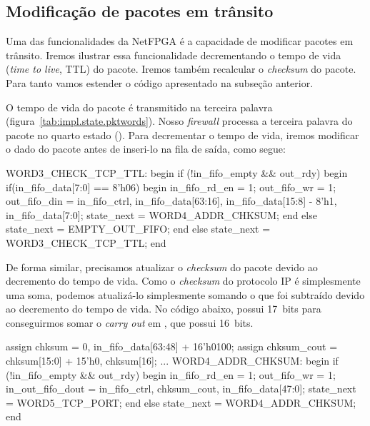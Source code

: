 \subsection{Modificação de pacotes em trânsito}
\label{sec:impl.mod}

Uma das funcionalidades da NetFPGA é a capacidade de modificar pacotes
em trânsito.  Iremos ilustrar essa funcionalidade decrementando o tempo
de vida (\emph{time to live}, TTL) do pacote.  Iremos também recalcular
o \emph{checksum} do pacote.  Para tanto vamos estender o código
apresentado na subseção anterior.

O tempo de vida do pacote é transmitido na terceira palavra
(figura~\ref{tab:impl.state.pktwords}).  Nosso \emph{firewall} processa
a terceira palavra do pacote no quarto estado ().
Para decrementar o tempo de vida, iremos modificar o dado do pacote
antes de inseri-lo na fila de saída, como segue:

\begin{verilogcode}
      WORD3_CHECK_TCP_TTL: begin
         if (!in_fifo_empty && out_rdy) begin
            if(in_fifo_data[7:0] == 8'h06) begin
               in_fifo_rd_en = 1;
               out_fifo_wr = 1;
               out_fifo_din = {in_fifo_ctrl, in_fifo_data[63:16],
                               in_fifo_data[15:8] - 8'h1,
                               in_fifo_data[7:0]};
               state_next = WORD4_ADDR_CHKSUM;
            end
            else
               state_next = EMPTY_OUT_FIFO;
         end
         else
            state_next = WORD3_CHECK_TCP_TTL;
      end
\end{verilogcode}

De forma similar, precisamos atualizar o \emph{checksum} do pacote
devido ao decremento do tempo de vida.  Como o \emph{checksum} do
protocolo IP é simplesmente uma soma, podemos atualizá-lo simplesmente
somando o que foi subtraído devido ao decremento do tempo de
vida.\footnotemark{} No código abaixo,  possui 17~bits para
conseguirmos somar o \emph{carry out} em , que
possui 16~bits.


\begin{verilogcode}
      assign chksum = {0, in_fifo_data[63:48]} + 16'h0100;
      assign chksum_cout = chksum[15:0] + {15'h0, chksum[16]};
        ...
      WORD4_ADDR_CHKSUM: begin
        if (!in_fifo_empty && out_rdy) begin
            in_fifo_rd_en = 1;
            out_fifo_wr = 1;
            in_out_fifo_dout = {in_fifo_ctrl, chksum_cout,
                        in_fifo_data[47:0]};
            state_next = WORD5_TCP_PORT;
        end
        else
            state_next = WORD4_ADDR_CHKSUM;
      end
\end{verilogcode}
